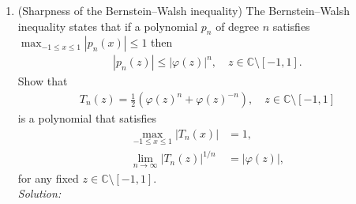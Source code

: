 \documentclass[10pt]{amsart}
\theoremstyle{nonumberplain}
\begin{document}
\begin{enumerate}[label={\bf {\arabic*}:}]
   \item (Sharpness of the Bernstein--Walsh inequality)  The
     Bernstein--Walsh inequality states that if a polynomial $p_n$ of
     degree $n$ satisfies $\max_{-1 \leq x \leq 1} |p_n(x)| \leq 1$
     then
     \begin{align*}
       |p_n(z)| \leq |\varphi(z)|^n, \quad z \in \mathbb C \setminus [-1,1].
     \end{align*}
     Show that
     \begin{align*}
        T_n(z) = \frac 1 2 \left( \varphi(z)^n + \varphi(z)^{-n}
       \right), \quad z \in \mathbb C \setminus [-1,1]
     \end{align*}
     is a polynomial that satisfies
     \begin{align*}
       \max_{-1 \leq x \leq 1} |T_n(x)| &= 1,\\
       \lim_{n \to \infty} |T_n(z)|^{1/n} &= |\varphi(z)|,
     \end{align*}
     for any fixed $z \in \mathbb C \setminus [-1,1]$. \\
\textit{Solution:} \\
\end{enumerate}
\end{document}
